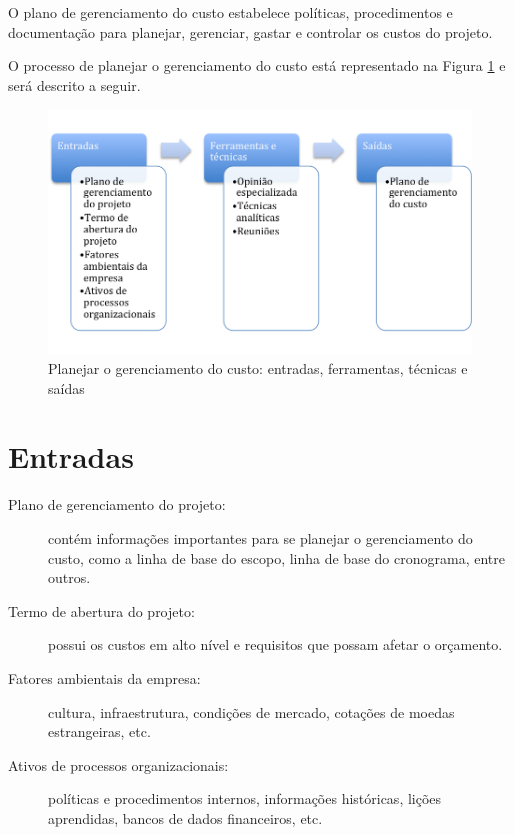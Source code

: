 
O plano de gerenciamento do custo estabelece políticas, procedimentos e documentação para planejar, gerenciar, gastar e controlar os custos do projeto.

O processo de planejar o gerenciamento do custo está representado na Figura \ref{fig:custos:plan:efts} e será descrito a seguir.

\begin{figure}[!h]
	\centering
	\includegraphics[scale=0.5]{Figuras/custos_efts_planejar.png}
	\caption{Planejar o gerenciamento do custo: entradas, ferramentas, técnicas e saídas}
	\label{fig:custos:plan:efts}
\end{figure}

\section{Entradas}

\begin{description}
	
	\item[Plano de gerenciamento do projeto:] contém informações importantes para se planejar o gerenciamento do custo, como a linha de base do escopo, linha de base do cronograma, entre outros.

	\item[Termo de abertura do projeto:] possui os custos em alto nível e requisitos que possam afetar o orçamento.

	\item[Fatores ambientais da empresa:] cultura, infraestrutura, condições de mercado, cotações de moedas estrangeiras, etc.

	\item[Ativos de processos organizacionais:] políticas e procedimentos internos, informações históricas, lições aprendidas, bancos de dados financeiros, etc.

\end{description}

